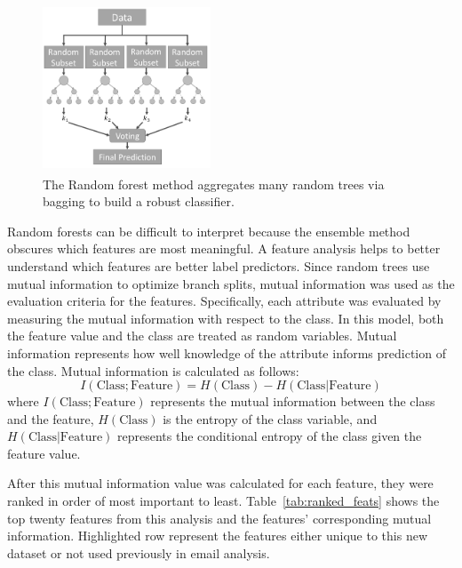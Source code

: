 \documentclass[10pt,twocolumn,conference]{IEEEtran}
\begin{document}
\begin{figure}[t]
	\centering
	\includegraphics[width=5cm,height=5cm,keepaspectratio,trim={0mm 2.5mm 0mm 2mm},clip]{RandForest_BW}
	\caption{The Random forest method aggregates many random trees via bagging to build a robust classifier.}
	\vspace{-8pt}
	\label{fig:rand_forest}
\end{figure}

Random forests can be difficult to interpret because the ensemble method obscures which features are most meaningful.
A feature analysis helps to better understand which features are better label predictors.
Since random trees use mutual information to optimize branch splits, mutual information was used as the evaluation criteria for the features.
Specifically, each attribute was evaluated by measuring the mutual information with respect to the class.
In this model, both the feature value and the class are treated as random variables.
Mutual information represents how well knowledge of the attribute informs prediction of the class.
Mutual information is calculated as follows:
\begin{equation}
I(\text{Class}; \text{Feature}) = H(\text{Class}) - H(\text{Class} | \text{Feature})
\end{equation} \label{eq:info_gained}
where $I(\text{Class}; \text{Feature})$ represents the mutual information between the class and the feature, $H(\text{Class})$ is the entropy of the class variable, and  $H(\text{Class} | \text{Feature})$ represents the conditional entropy of the class given the feature value.  

After this mutual information value was calculated for each feature, they were ranked in order of most important to least.
Table~\ref{tab:ranked_feats} shows the top twenty features from this analysis and the features' corresponding mutual information.
Highlighted row represent the features either unique to this new dataset or not used previously in email analysis.
\end{document}

